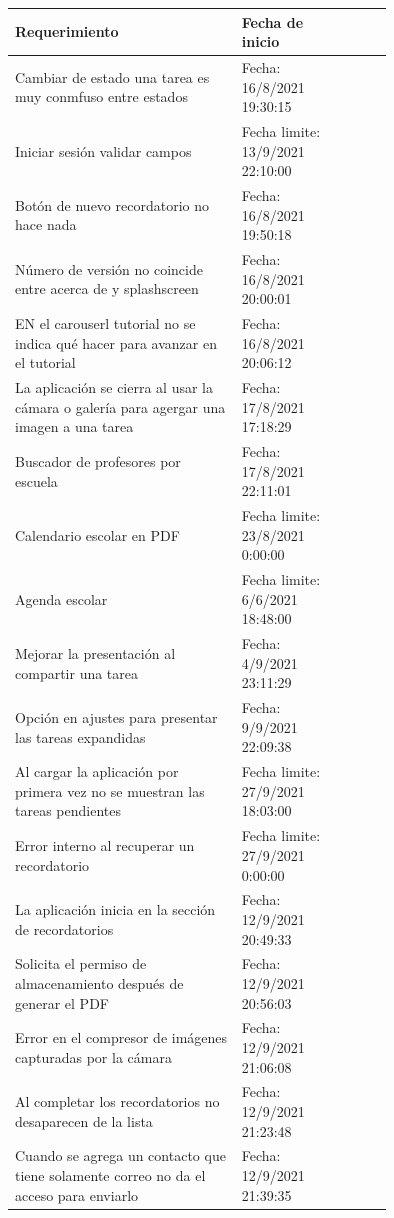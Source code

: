 \documentclass[10pt]{article}
\begin{document}
\centering
\begin{table}[H]
\begin{tabular}{|p{0.6\linewidth}|l |p{0.15\linewidth}|}
\hline
\textbf{Requerimiento}                                   & \textbf{Fecha de inicio} \\ \hline
{Cambiar de estado una tarea es muy conmfuso entre estados } & Fecha: 16/8/2021 19:30:15 \\ \hline
{Iniciar sesión validar campos } &  Fecha limite: 13/9/2021 22:10:00 \\ \hline
{Botón de nuevo recordatorio no hace nada } & Fecha: 16/8/2021 19:50:18 \\ \hline
{Número de versión no coincide entre acerca de y splashscreen } & Fecha: 16/8/2021 20:00:01 \\ \hline
{EN el carouserl tutorial no se indica qué hacer para avanzar en el tutorial } & Fecha: 16/8/2021 20:06:12 \\ \hline
{La aplicación se cierra al usar la cámara o galería para agergar una imagen a una tarea } & Fecha: 17/8/2021 17:18:29 \\ \hline
{Buscador de profesores por escuela} & Fecha: 17/8/2021 22:11:01 \\ \hline
{Calendario escolar en PDF } & Fecha limite: 23/8/2021 0:00:00 \\ \hline
{Agenda escolar } & Fecha limite: 6/6/2021 18:48:00 \\ \hline
{Mejorar la presentación al compartir una tarea } & Fecha: 4/9/2021 23:11:29 \\ \hline
{Opción en ajustes para presentar las tareas expandidas } & Fecha: 9/9/2021 22:09:38 \\ \hline
{Al cargar la aplicación por primera vez no se muestran las tareas pendientes } & Fecha limite: 27/9/2021 18:03:00 \\ \hline
{Error interno al recuperar un recordatorio } & Fecha limite: 27/9/2021 0:00:00 \\ \hline
{La aplicación inicia en la sección de recordatorios} & Fecha: 12/9/2021 20:49:33  \\ \hline
{Solicita el permiso de almacenamiento después de generar el PDF } & Fecha: 12/9/2021 20:56:03 \\ \hline
{Error en el compresor de imágenes capturadas por la cámara } & Fecha: 12/9/2021 21:06:08  \\ \hline
{Al completar los recordatorios no desaparecen de la lista } & Fecha: 12/9/2021 21:23:48 \\ \hline
{Cuando se agrega un contacto que tiene solamente correo no da el acceso para enviarlo } & Fecha: 12/9/2021 21:39:35 \\ \hline

\end{tabular}
\end{table}
\end{document}
